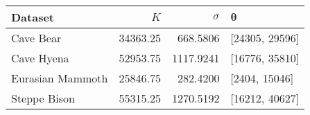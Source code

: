 
\begin{tabular}{lrrl}
\toprule
Dataset & $K$ & $\sigma$ & $\bm{\theta}$\\
\midrule
Cave Bear & 34363.25 & 668.5806 & {}[24305, 29596]\\
Cave Hyena & 52953.75 & 1117.9241 & {}[16776, 35810]\\
Eurasian Mammoth & 25846.75 & 282.4200 & {}[2404, 15046]\\
Steppe Bison & 55315.25 & 1270.5192 & {}[16212, 40627]\\
\bottomrule
\end{tabular}

